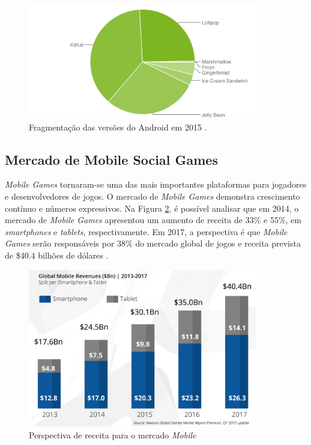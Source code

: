 \begin{figure}[h]
  \centering
  \includegraphics[width=10cm]{figuras/android_chart}
  \caption{Fragmentação das versões do Android em 2015 \cite{dashboardGoogle}.}
  \label{figura:android_chart}
\end{figure}

  \subsection{Mercado de Mobile Social Games}

\textit{Mobile Games} tornaram-se uma das mais importantes plataformas para
jogadores e desenvolvedores de jogos. O mercado de \textit{Mobile Games}
demonstra crescimento contínuo e números expressivos. Na Figura
\ref{figura:gmgcMarket}, é possível analisar que em 2014, o mercado de
\textit{Mobile Games} apresentou um aumento de receita de 33\% e 55\%, em
\textit{smartphones} e \textit{tablets}, respectivamente. Em 2017, a
perspectiva é que \textit{Mobile Games} serão responsáveis por 38\% do mercado
global de jogos e receita prevista de \$40.4 bilhões de dólares \cite{gmgc}.

\begin{figure}[h]
  \centering
  \includegraphics[width=10cm]{figuras/gmgcMarket}
  \caption{Perspectiva de receita para o mercado \textit{Mobile} \cite{gmgc}}
  \label{figura:gmgcMarket}
\end{figure}

